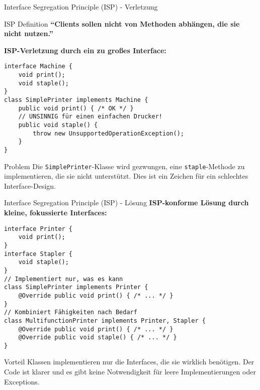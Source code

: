 \begin{frame}[fragile]{Interface Segregation Principle (ISP) - Verletzung}
  \begin{exampleblock}{ISP Definition}
    \textbf{``Clients sollen nicht von Methoden abhängen, die sie nicht nutzen.''}
  \end{exampleblock}
  \textbf{ISP-Verletzung durch ein zu großes Interface:}
  \begin{lstlisting}[style=java, basicstyle=\tiny\ttfamily]
interface Machine {
    void print();
    void staple();
}
class SimplePrinter implements Machine {
    public void print() { /* OK */ }
    // UNSINNIG für einen einfachen Drucker!
    public void staple() {
        throw new UnsupportedOperationException();
    }
}
  \end{lstlisting}
  \begin{alertblock}{Problem}
    Die \texttt{SimplePrinter}-Klasse wird gezwungen, eine \texttt{staple}-Methode zu implementieren, die sie nicht unterstützt. Dies ist ein Zeichen für ein schlechtes Interface-Design.
  \end{alertblock}
\end{frame}

\begin{frame}[fragile]{Interface Segregation Principle (ISP) - Lösung}
  \textbf{ISP-konforme Lösung durch kleine, fokussierte Interfaces:}
  \begin{lstlisting}[style=java, basicstyle=\tiny\ttfamily]
interface Printer {
    void print();
}
interface Stapler {
    void staple();
}
// Implementiert nur, was es kann
class SimplePrinter implements Printer {
    @Override public void print() { /* ... */ }
}
// Kombiniert Fähigkeiten nach Bedarf
class MultifunctionPrinter implements Printer, Stapler {
    @Override public void print() { /* ... */ }
    @Override public void staple() { /* ... */ }
}
  \end{lstlisting}
  \begin{exampleblock}{Vorteil}
    Klassen implementieren nur die Interfaces, die sie wirklich benötigen. Der Code ist klarer und es gibt keine Notwendigkeit für leere Implementierungen oder Exceptions.
  \end{exampleblock}
\end{frame}

